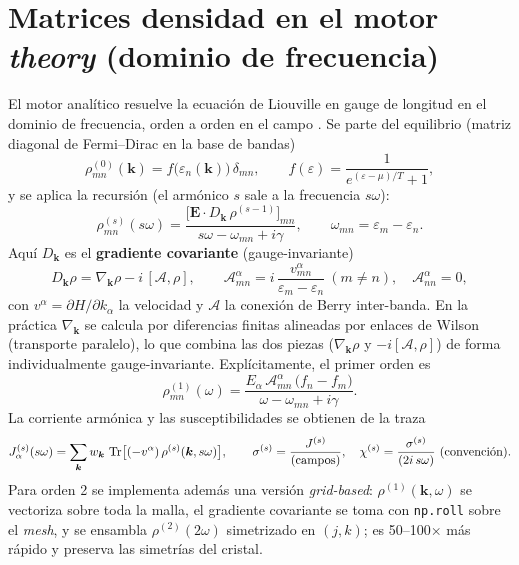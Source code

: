 \documentclass[11pt,a4paper]{article}
\newcommand{\kk}{\bm{k}}
\newcommand{\bE}{\bm{E}}
\newcommand{\rhoeq}{\rho^{(0)}}
\begin{document}
\section{Matrices densidad en el motor \emph{theory} (dominio de frecuencia)}
El motor anal\'itico resuelve la ecuaci\'on de Liouville en gauge de
longitud en el dominio de frecuencia, orden a orden en el campo
\cite{Hipolito2018}. Se parte del equilibrio (matriz diagonal de
Fermi--Dirac en la base de bandas)
\begin{equation}
  \rhoeq_{mn}(\kk) = f\big(\varepsilon_n(\kk)\big)\,\delta_{mn},
  \qquad
  f(\varepsilon) = \frac{1}{e^{(\varepsilon-\mu)/T}+1},
\end{equation}
y se aplica la recursi\'on (el arm\'onico $s$ sale a la frecuencia
$s\omega$):
\begin{equation}
  \boxed{\;
  \rho^{(s)}_{mn}(s\omega) =
    \frac{\big[\bE\cdot D_{\kk}\,\rho^{(s-1)}\big]_{mn}}
         {\,s\omega - \omega_{mn} + i\gamma\,},
  \qquad \omega_{mn}=\varepsilon_m-\varepsilon_n. \;}
\end{equation}
Aqu\'i $D_{\kk}$ es el \textbf{gradiente covariante} (gauge-invariante)
\begin{equation}
  D_{\kk}\rho = \nabla_{\kk}\rho - i\,[\mathcal{A},\rho],
  \qquad
  \mathcal{A}^{\alpha}_{mn} = i\,\frac{v^{\alpha}_{mn}}{\varepsilon_m-\varepsilon_n}\ (m\neq n),\quad
  \mathcal{A}^{\alpha}_{nn}=0,
\end{equation}
con $v^{\alpha}=\partial H/\partial k_\alpha$ la velocidad y
$\mathcal{A}$ la conexi\'on de Berry inter-banda. En la pr\'actica
$\nabla_{\kk}$ se calcula por diferencias finitas alineadas por enlaces
de Wilson (transporte paralelo), lo que combina las dos piezas
($\nabla_{\kk}\rho$ y $-i[\mathcal{A},\rho]$) de forma individualmente
gauge-invariante. Expl\'icitamente, el primer orden es
\begin{equation}
  \rho^{(1)}_{mn}(\omega) =
    \frac{E_\alpha\,\mathcal{A}^{\alpha}_{mn}\,\big(f_n-f_m\big)}
         {\omega-\omega_{mn}+i\gamma}.
\end{equation}
La corriente arm\'onica y las susceptibilidades se obtienen de la traza
\begin{equation}
  J^{(s)}_{\alpha}(s\omega) = \sum_{\kk} w_{\kk}\,
      \Tr\!\big[(-v^{\alpha})\,\rho^{(s)}(\kk,s\omega)\big],
  \qquad
  \sigma^{(s)} = \frac{J^{(s)}}{\text{(campos)}},\quad
  \chi^{(s)}=\frac{\sigma^{(s)}}{(2i\,s\omega)}\ \text{(convenci\'on)} .
\end{equation}
Para orden 2 se implementa adem\'as una versi\'on \emph{grid-based}:
$\rho^{(1)}(\kk,\omega)$ se vectoriza sobre toda la malla, el gradiente
covariante se toma con \texttt{np.roll} sobre el \emph{mesh}, y se
ensambla $\rho^{(2)}(2\omega)$ simetrizado en $(j,k)$; es 50--100$\times$
m\'as r\'apido y preserva las simetr\'ias del cristal.
\end{document}
